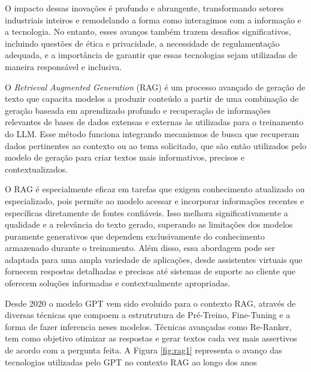 O impacto dessas inovações é profundo e abrangente, transformando setores industriais inteiros e remodelando a forma como interagimos com a informação e a tecnologia. No entanto, esses avanços também trazem desafios significativos, incluindo questões de ética e privacidade, a necessidade de regulamentação adequada, e a importância de garantir que essas tecnologias sejam utilizadas de maneira responsável e inclusiva. 

O \textit{Retrieval Augmented Generation} (RAG) \cite{gao2024retrievalaugmentedgenerationlargelanguage} é um processo avançado de geração de texto que capacita modelos a produzir conteúdo a partir de uma combinação de geração baseada em aprendizado profundo e recuperação de informações relevantes de bases de dados extensas e externas às utilizadas para o treinamento do LLM. Esse método funciona integrando mecanismos de busca que recuperam dados pertinentes ao contexto ou ao tema solicitado, que são então utilizados pelo modelo de geração para criar textos mais informativos, precisos e contextualizados.

O RAG é especialmente eficaz em tarefas que exigem conhecimento atualizado ou especializado, pois permite ao modelo acessar e incorporar informações recentes e específicas diretamente de fontes confiáveis. Isso melhora significativamente a qualidade e a relevância do texto gerado, superando as limitações dos modelos puramente generativos que dependem exclusivamente do conhecimento armazenado durante o treinamento. Além disso, essa abordagem pode ser adaptada para uma ampla variedade de aplicações, desde assistentes virtuais que fornecem respostas detalhadas e precisas até sistemas de suporte ao cliente que oferecem soluções informadas e contextualmente apropriadas.

Desde 2020 o modelo GPT vem sido evoluido para o contexto RAG, através de diversas técnicas que compoem a estrutrutura de Pré-Treino, Fine-Tuning e a forma de fazer inferencia neses modelos. Técnicas avançadas como Re-Ranker, tem como objetivo otimizar as respostas e gerar textos cada vez mais assertivos de acordo com a pergunta feita.
A Figura \ref{fig:rag1} representa o avanço das tecnologias utilizadas pelo GPT \cite{Liu_2023} no contexto RAG ao longo dos anos

